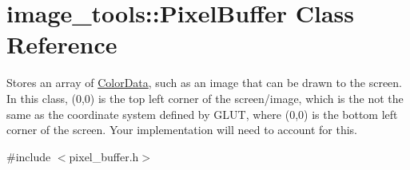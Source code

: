\hypertarget{classimage__tools_1_1PixelBuffer}{}\section{image\+\_\+tools\+:\+:Pixel\+Buffer Class Reference}
\label{classimage__tools_1_1PixelBuffer}


Stores an array of \hyperlink{classimage__tools_1_1ColorData}{Color\+Data}, such as an image that can be drawn to the screen. In this class, (0,0) is the top left corner of the screen/image, which is the not the same as the coordinate system defined by G\+L\+UT, where (0,0) is the bottom left corner of the screen. Your implementation will need to account for this.  




{\ttfamily \#include $<$pixel\+\_\+buffer.\+h$>$}

